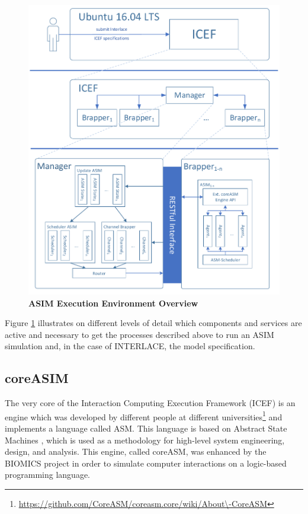\begin{figure}[htbp]
  \centering
  \includegraphics[width=1.0\textwidth, clip, trim=1mm 1mm 1mm 1mm]{Figures/environment_asim}
  \caption{\bf\small ASIM Execution Environment Overview}
  \label{fig:icef-intro-asim}
\end{figure}

Figure \ref{fig:icef-intro-asim} illustrates on different levels of detail which components and services are active and necessary to get the processes described above to run an ASIM simulation and, in the case of INTERLACE, the model specification.

\subsection{coreASIM}
\label{sec:coreasim-details}

The very core of the Interaction Computing Execution Framework (ICEF) is an engine which was developed by different people at different universities\footnote{\url{https://github.com/CoreASM/coreasm.core/wiki/About\-CoreASM}} and implements a language called ASM. This language is based on Abstract State Machines \cite{BoergerStaerk2003}, which is used as a methodology for high-level system engineering, design, and analysis. This engine, called coreASM, was enhanced by the BIOMICS project in order to simulate computer interactions on a logic-based programming language.

